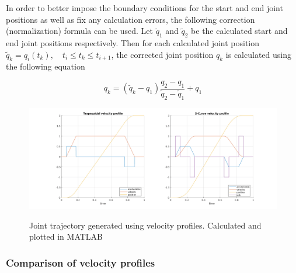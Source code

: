 In order to better impose the boundary conditions for the start and end joint positions as well as fix any calculation errors, the following correction (normalization) formula can be used. 
Let $\tilde{q}_1$ and $\tilde{q}_2$ be the calculated start and end joint positions respectively. Then for each calculated joint position $\tilde{q}_k = q_i(t_k), \quad t_i \leq t_k \leq t_{i+1}$, 
the corrected joint position $q_k$ is calculated using the following equation

\begin{equation}
q_k = (\tilde{q}_k - q_1) \frac{q_2 - q_1}{\tilde{q}_2 - \tilde{q}_1} + q_1
\end{equation}


\begin{center}
\begin{figure}[!htb]
\centering
\includegraphics[width=\textwidth]{images/vel-profiles.png}\\
\caption{Joint trajectory generated using velocity profiles. Calculated and plotted in MATLAB} 
\end{figure}
\end{center}


\subsubsection{Comparison of velocity profiles}

